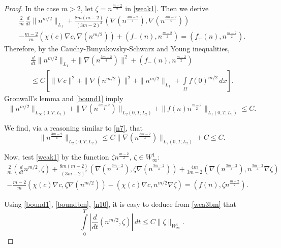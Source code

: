 \documentclass[10pt]{amsart}
\begin{document}
\begin{proof}
In the case $m>2$,  let $\zeta=n^{\frac {m-2}2}$ in \eqref{weak1}. Then we derive
\begin{multline}\label{wea1bm}
\frac 2 m \,\frac {d}{dt}\|n^{m/2}\|_{L_1}+ \frac {8m(m-2)}{(3m-2)^2} (\nabla(n^{\frac {3m-2}4}),\nabla(n^{\frac {3m-2}4})) \\ -\frac{m-2}{m}(\chi (c) \nabla c,\nabla (n^{m/2}))+(f_-(n),n^{\frac {m-2}2})=(f_+(n),n^{\frac {m-2}2}).
\end{multline}
Therefore, by the Cauchy-Bunyakovsky-Schwarz and Young inequalities, 
\begin{multline}\label{wea2bm}
\frac {d}{dt}\|n^{m/2}\|_{L_1}+ \|\nabla(n^{\frac {3m-2}4})\|^2+(f_-(n),n^{\frac {m-2}2}) \\ \leq C \left[\|\nabla c\|^2+\|\nabla (n^{m/2})\|^2+\|n^{m/2}\|_{L_1}+\int\limits_{\Omega} f(0)^{m/2} \, dx\right].\end{multline}
Gronwall's lemma and \eqref{bound1} imply \begin{equation} \label{boundbm}
\|n^{m/2}\|_{L_\infty(0,T;L_1)}+ \|\nabla(n^{\frac {3m-2}4})\|_{L_2(0,T;L_2)}+\|f(n)n^{\frac {m-2}2}\|_{L_1(0,T;L_1)} \leq C .
\end{equation}

We find, via a reasoning similar to \eqref{n7}, that 
\begin{equation}\label{n10}\|n^{\frac {3m-2}4}\|_{L_2(0,T;L_2)}\leq C\|\nabla(n^{\frac {3m-2}4})\|_{L_2(0,T;L_2)}+C\leq C.\end{equation}

Now, test \eqref{weak1} by the function $\zeta n^{\frac {m-2}2}$, $\zeta\in W^1_\infty$: 
\begin{multline}\label{wea3bm}
\frac 2 m \left(\frac {d}{dt} n^{m/2}, \zeta \right)+ \frac {8m(m-2)}{(3m-2)^2} (\nabla(n^{\frac {3m-2}4}),\zeta\nabla(n^{\frac {3m-2}4}))+ \frac {4m}{3m-2} (\nabla(n^{\frac {3m-2}4}),n^{\frac {3m-2}4}\nabla \zeta) \\ -\frac{m-2}{m}(\chi (c) \nabla c,\zeta\nabla (n^{m/2}))-(\chi (c) \nabla c,n^{m/2}\nabla\zeta)=(f(n),\zeta n^{\frac {m-2}2}).\end{multline}

Using \eqref{bound1}, \eqref{boundbm}, \eqref{n10}, it is easy to deduce from \eqref{wea3bm} that 
\begin{equation}\label{boundtbm}\int\limits_0^T\left|\frac {d}{dt} (n^{m/2},\zeta)\right|\,dt\leq C\|\zeta\|_{W^1_\infty}.\end{equation}


\end{proof}
\end{document}
